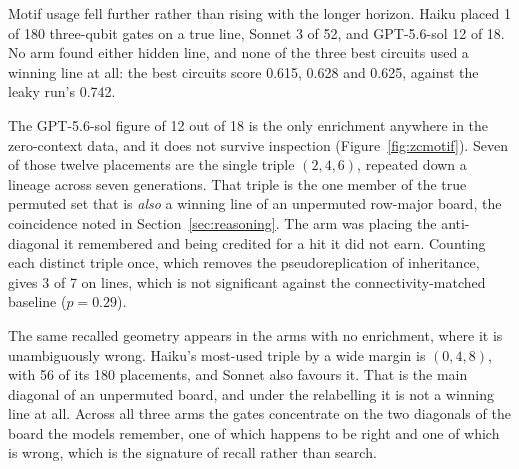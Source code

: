 \documentclass[11pt]{article}
\begin{document}
Motif usage fell further rather than rising with the longer horizon. Haiku placed
1 of 180 three-qubit gates on a true line, Sonnet 3 of 52, and GPT-5.6-sol 12 of
18. No arm found either hidden line, and none of the three best circuits used a
winning line at all: the best circuits score 0.615, 0.628 and 0.625, against the
leaky run's 0.742.

The GPT-5.6-sol figure of 12 out of 18 is the only enrichment anywhere in the
zero-context data, and it does not survive inspection
(Figure~\ref{fig:zcmotif}). Seven of those twelve placements are the single
triple $(2,4,6)$, repeated down a lineage across seven generations. That triple
is the one member of the true permuted set that is \emph{also} a winning line of
an unpermuted row-major board, the coincidence noted in
Section~\ref{sec:reasoning}. The arm was placing the anti-diagonal it remembered
and being credited for a hit it did not earn. Counting each distinct triple once,
which removes the pseudoreplication of inheritance, gives 3 of 7 on lines, which
is not significant against the connectivity-matched baseline ($p = 0.29$).

The same recalled geometry appears in the arms with no enrichment, where it is
unambiguously wrong. Haiku's most-used triple by a wide margin is $(0,4,8)$, with
56 of its 180 placements, and Sonnet also favours it. That is the main diagonal
of an unpermuted board, and under the relabelling it is not a winning line at
all. Across all three arms the gates concentrate on the two diagonals of the
board the models remember, one of which happens to be right and one of which is
wrong, which is the signature of recall rather than search.
\end{document}
